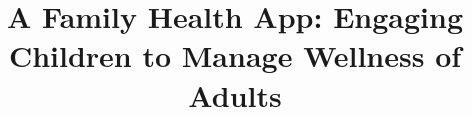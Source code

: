 \documentclass{sig-alternate}
\begin{document}
\setlength{\parindent}{0pt}
%

\title{A Family Health App: Engaging Children to Manage Wellness of Adults}
%
%
%
%
%
\end{document}
